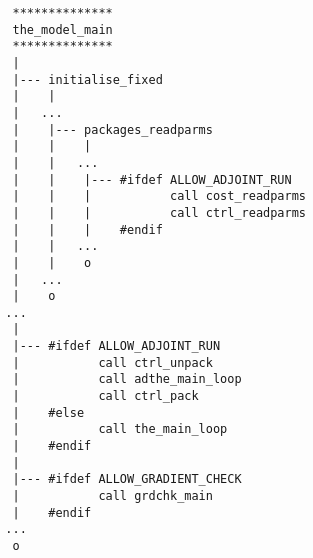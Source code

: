 
{\small
\begin{verbatim}
   **************
   the_model_main
   **************
   |
   |--- initialise_fixed
   |    |
   |   ...
   |    |--- packages_readparms
   |    |    |
   |    |   ...
   |    |    |--- #ifdef ALLOW_ADJOINT_RUN
   |    |    |           call cost_readparms
   |    |    |           call ctrl_readparms
   |    |    |    #endif
   |    |   ...
   |    |    o
   |   ...
   |    o
  ...
   |
   |--- #ifdef ALLOW_ADJOINT_RUN
   |           call ctrl_unpack
   |           call adthe_main_loop
   |           call ctrl_pack
   |    #else
   |           call the_main_loop
   |    #endif
   |
   |--- #ifdef ALLOW_GRADIENT_CHECK
   |           call grdchk_main
   |    #endif
  ...
   o
\end{verbatim}
}
